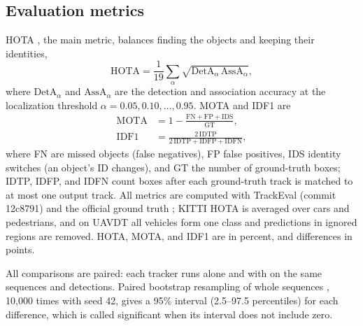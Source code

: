 \subsection{Evaluation metrics}\label{sec:metrics}
HOTA \cite{luiten2021hota}, the main metric, balances finding the objects and keeping their
identities,
\begin{equation}
\mathrm{HOTA}=\frac{1}{19}\sum_{\alpha}\sqrt{\mathrm{DetA}_\alpha\,\mathrm{AssA}_\alpha},
\label{eq:hota}
\end{equation}
where $\mathrm{DetA}_\alpha$ and $\mathrm{AssA}_\alpha$ are the detection and association accuracy
at the localization threshold $\alpha=0.05,0.10,\dots,0.95$. MOTA \cite{bernardin2008clear} and
IDF1 \cite{ristani2016idf1} are
\begin{align}
\mathrm{MOTA}&=1-\frac{\mathrm{FN}+\mathrm{FP}+\mathrm{IDS}}{\mathrm{GT}},\label{eq:mota}\\
\mathrm{IDF1}&=\frac{2\,\mathrm{IDTP}}{2\,\mathrm{IDTP}+\mathrm{IDFP}+\mathrm{IDFN}},\label{eq:idf1}
\end{align}
where FN are missed objects (false negatives), FP false positives, IDS identity switches (an
object's ID changes), and GT the number of ground-truth boxes; IDTP, IDFP, and IDFN count boxes
after each ground-truth track is matched to at most one output track. All metrics are computed
with TrackEval (commit 12c8791) and the official ground truth \cite{dendorfer2021motchallenge};
KITTI HOTA is averaged over cars and pedestrians, and on UAVDT all vehicles form one class and
predictions in ignored regions are removed. HOTA, MOTA, and IDF1 are in percent, and differences
in points.

All comparisons are paired: each tracker runs alone and with \scl{} on the same sequences and
detections. Paired bootstrap resampling of whole sequences \cite{efron1993bootstrap}, 10,000 times
with seed 42, gives a 95\% interval (2.5--97.5 percentiles) for each difference, which is called
significant when its interval does not include zero.

